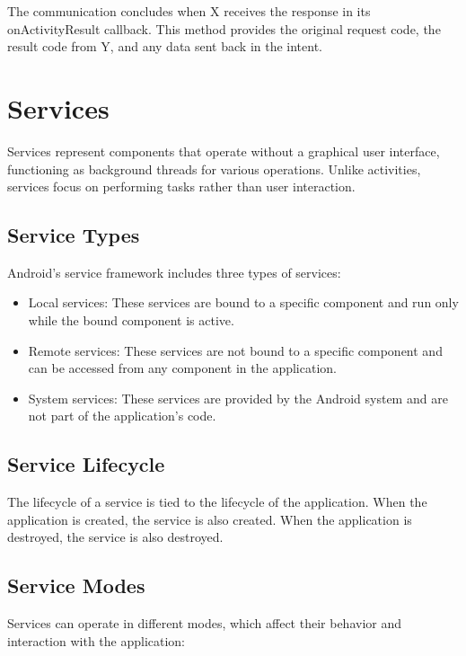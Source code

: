 \documentclass{article}
\begin{document}
The communication concludes when X receives the response in its onActivityResult callback. This method provides the original request code, the result code from Y, and any data sent back in the intent.

\section{Services}
Services represent components that operate without a graphical user interface, functioning as background threads for various operations. Unlike activities, services focus on performing tasks rather than user interaction.

\subsection{Service Types}
Android's service framework includes three types of services:

\begin{itemize}
\item Local services: These services are bound to a specific component and run only while the bound component is active.
\item Remote services: These services are not bound to a specific component and can be accessed from any component in the application.
\item System services: These services are provided by the Android system and are not part of the application's code.
\end{itemize}

\subsection{Service Lifecycle}
The lifecycle of a service is tied to the lifecycle of the application. When the application is created, the service is also created. When the application is destroyed, the service is also destroyed.

\subsection{Service Modes}
Services can operate in different modes, which affect their behavior and interaction with the application:
\end{document}
